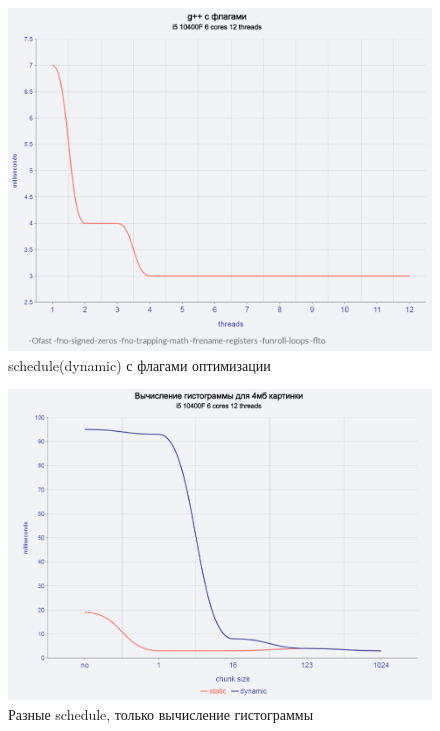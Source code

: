 \documentclass{article}
\begin{document}
  \begin{figure}[H]
	\includegraphics[width=1\textwidth]{pictures/Screenshot_3.png}
	\caption{schedule(dynamic) с флагами оптимизации}
  \end{figure}
  \begin{figure}[H]
	\includegraphics[width=1\textwidth]{pictures/Screenshot_4.png}
	\caption{Разные schedule, только вычисление гистограммы}
  \end{figure}
\end{document}
